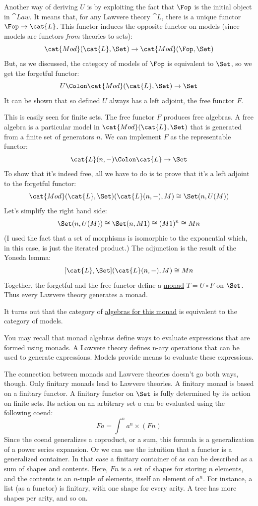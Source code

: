 Another way of deriving $U$ is by exploiting the fact that
$\Fop$ is the initial object in $\cat{Law}$. It
means that, for any Lawvere theory $\cat{L}$, there is a unique
functor $\Fop \to \cat{L}$. This functor induces the
opposite functor on models (since models are functors \emph{from}
theories to sets):
\[\cat{Mod}(\cat{L}, \Set) \to \cat{Mod}(\Fop, \Set)\]
But, as we discussed, the category of models of
$\Fop$ is equivalent to $\Set$, so we get
the forgetful functor:
\[U \Colon \cat{Mod}(\cat{L}, \Set) \to \Set\]
It can be shown that so defined $U$ always has a left adjoint,
the free functor $F$.

This is easily seen for finite sets. The free functor $F$
produces free algebras. A free algebra is a particular model in
$\cat{Mod}(\cat{L}, \Set)$ that is generated from a finite set of generators
$n$. We can implement $F$ as the representable functor:
\[\cat{L}(n, -) \Colon \cat{L} \to \Set\]
To show that it's indeed free, all we have to do is to prove that it's a
left adjoint to the forgetful functor:
\[\cat{Mod}(\cat{L}, \Set)(\cat{L}(n, -), M) \cong \Set(n, U(M))\]
Let's simplify the right hand side:
\[\Set(n, U(M)) \cong \Set(n, M 1) \cong (M 1)^n \cong M n\]
(I used the fact that a set of morphisms is isomorphic to the
exponential which, in this case, is just the iterated product.) The
adjunction is the result of the Yoneda lemma:
\[[\cat{L}, \Set](\cat{L}(n, -), M) \cong M n\]
Together, the forgetful and the free functor define a
\hyperref[monads-categorically]{monad}
$T = U \circ F$ on $\Set$. Thus every Lawvere theory generates
a monad.

It turns out that the category of
\hyperref[algebras-for-monads]{algebras
  for this monad} is equivalent to the category of models.

You may recall that monad algebras define ways to evaluate expressions
that are formed using monads. A Lawvere theory defines n-ary operations
that can be used to generate expressions. Models provide means to
evaluate these expressions.

The connection between monads and Lawvere theories doesn't go both ways,
though. Only finitary monads lead to Lawvere theories. A finitary monad
is based on a finitary functor. A finitary functor on $\Set$ is
fully determined by its action on finite sets. Its action on an
arbitrary set $a$ can be evaluated using the following coend:
\[F a = \int^n a^n \times (F n)\]
Since the coend generalizes a coproduct, or a sum, this formula is a
generalization of a power series expansion. Or we can use the intuition
that a functor is a generalized container. In that case a finitary
container of $a$s can be described as a sum of shapes and
contents. Here, $F n$ is a set of shapes for storing $n$ elements,
and the contents is an $n$-tuple of elements, itself an element of
$a^n$. For instance, a list (as a functor) is finitary, with one
shape for every arity. A tree has more shapes per arity, and so on.

